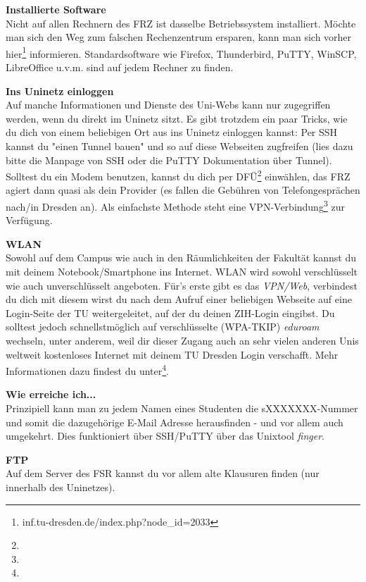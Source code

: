 \textbf{Installierte Software} \\
Nicht auf allen Rechnern des FRZ ist dasselbe Betriebssystem installiert.
Möchte man sich den Weg zum falschen Rechenzentrum ersparen, kann man sich vorher hier\footnote{inf.tu-dresden.de/index.php?node_id=2033} informieren.
Standardsoftware wie Firefox, Thunderbird, PuTTY, WinSCP, LibreOffice u.v.m. sind auf jedem Rechner zu finden.

\textbf{Ins Uninetz einloggen} \\
Auf manche Informationen und Dienste des Uni-Webs kann nur zugegriffen werden, wenn du direkt im Uninetz sitzt.
Es gibt trotzdem ein paar Tricks, wie du dich von einem beliebigen Ort aus ins Uninetz einloggen kannst:
Per SSH kannst du "einen Tunnel bauen" und so auf diese Webseiten zugfreifen (lies dazu bitte die Manpage von SSH oder die PuTTY Dokumentation über Tunnel).
Solltest du ein Modem benutzen, kannst du dich per DFÜ\footnote{} einwählen, das FRZ agiert dann quasi als dein Provider (es fallen die Gebühren von Telefongesprächen nach/in Dresden an).
Als einfachste Methode steht eine VPN-Verbindung\footnote{} zur Verfügung.

\textbf{WLAN} \\
Sowohl auf dem Campus wie auch in den Räumlichkeiten der Fakultät kannst du mit deinem Notebook/Smartphone ins Internet.
WLAN wird sowohl verschlüsselt wie auch unverschlüsselt angeboten.
Für's erste gibt es das \textit{VPN/Web}, verbindest du dich mit diesem wirst du nach dem Aufruf einer beliebigen Webseite auf eine Login-Seite der TU weitergeleitet, auf der du deinen ZIH-Login eingibst.
Du solltest jedoch schnellstmöglich auf verschlüsselte (WPA-TKIP) \textit{eduroam} wechseln, unter anderem, weil dir dieser Zugang auch an sehr vielen anderen Unis weltweit kostenloses Internet mit deinem TU Dresden Login verschafft.
Mehr Informationen dazu findest du unter\footnote{}.

\textbf{Wie erreiche ich...} \\
Prinzipiell kann man zu jedem Namen eines Studenten die sXXXXXXX-Nummer und somit die dazugehörige E-Mail Adresse herausfinden - und vor allem auch umgekehrt.
Dies funktioniert über SSH/PuTTY über das Unixtool \textit{finger}.

\textbf{FTP} \\
Auf dem Server des FSR kannst du vor allem alte Klausuren finden (nur innerhalb des Uninetzes).
